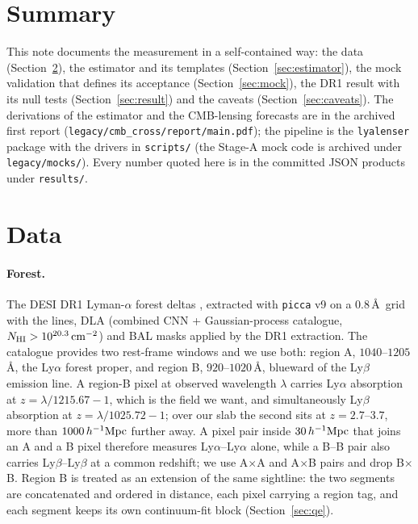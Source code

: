 \documentclass[11pt,a4paper]{article}
\newcommand{\Mpch}{\,h^{-1}{\rm Mpc}}
\begin{document}
\section{Summary}
This note documents the measurement in a self-contained way: the data (Section~\ref{sec:data}), the estimator and its templates (Section~\ref{sec:estimator}), the mock validation that defines its acceptance (Section~\ref{sec:mock}), the DR1 result with its null tests (Section~\ref{sec:result}) and the caveats (Section~\ref{sec:caveats}). The derivations of the estimator and the CMB-lensing forecasts are in the archived first report (\texttt{legacy/cmb\_cross/report/main.pdf}); the pipeline is the \texttt{lyalenser} package with the drivers in \texttt{scripts/} (the Stage-A mock code is archived under \texttt{legacy/mocks/}). Every number quoted here is in the committed JSON products under \texttt{results/}.

\section{Data}
\label{sec:data}
\paragraph{Forest.} The DESI DR1 Lyman-$\alpha$ forest deltas \citep{2503.14745,2306.06312}, extracted with \texttt{picca} v9 on a 0.8\,\AA\ grid with the lines, DLA (combined CNN + Gaussian-process catalogue, $N_{\rm HI}>10^{20.3}\,{\rm cm}^{-2}$) and BAL masks applied by the DR1 extraction. The catalogue provides two rest-frame windows and we use both: region A, $1040$--$1205$\,\AA, the Ly$\alpha$ forest proper, and region B, $920$--$1020$\,\AA, blueward of the Ly$\beta$ emission line. A region-B pixel at observed wavelength $\lambda$ carries Ly$\alpha$ absorption at $z=\lambda/1215.67-1$, which is the field we want, and simultaneously Ly$\beta$ absorption at $z=\lambda/1025.72-1$; over our slab the second sits at $z=2.7$--$3.7$, more than $1000\Mpch$ further away. A pixel pair inside $30\Mpch$ that joins an A and a B pixel therefore measures Ly$\alpha$--Ly$\alpha$ alone, while a B--B pair also carries Ly$\beta$--Ly$\beta$ at a common redshift; we use A$\times$A and A$\times$B pairs and drop B$\times$B. Region B is treated as an extension of the same sightline: the two segments are concatenated and ordered in distance, each pixel carrying a region tag, and each segment keeps its own continuum-fit block (Section~\ref{sec:qe}).
\end{document}
